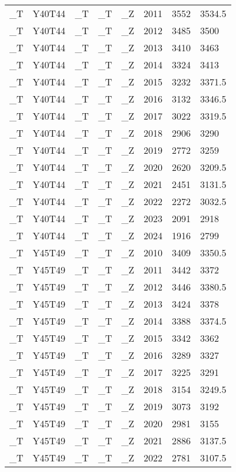 \begin{longtable}[t]{llllllll}
\_T & Y40T44 & \_T & \_T & \_Z & 2011 & 3552 & 3534.5\\
\_T & Y40T44 & \_T & \_T & \_Z & 2012 & 3485 & 3500\\
\_T & Y40T44 & \_T & \_T & \_Z & 2013 & 3410 & 3463\\
\_T & Y40T44 & \_T & \_T & \_Z & 2014 & 3324 & 3413\\
\addlinespace
\_T & Y40T44 & \_T & \_T & \_Z & 2015 & 3232 & 3371.5\\
\_T & Y40T44 & \_T & \_T & \_Z & 2016 & 3132 & 3346.5\\
\_T & Y40T44 & \_T & \_T & \_Z & 2017 & 3022 & 3319.5\\
\_T & Y40T44 & \_T & \_T & \_Z & 2018 & 2906 & 3290\\
\_T & Y40T44 & \_T & \_T & \_Z & 2019 & 2772 & 3259\\
\addlinespace
\_T & Y40T44 & \_T & \_T & \_Z & 2020 & 2620 & 3209.5\\
\_T & Y40T44 & \_T & \_T & \_Z & 2021 & 2451 & 3131.5\\
\_T & Y40T44 & \_T & \_T & \_Z & 2022 & 2272 & 3032.5\\
\_T & Y40T44 & \_T & \_T & \_Z & 2023 & 2091 & 2918\\
\_T & Y40T44 & \_T & \_T & \_Z & 2024 & 1916 & 2799\\
\addlinespace
\_T & Y45T49 & \_T & \_T & \_Z & 2010 & 3409 & 3350.5\\
\_T & Y45T49 & \_T & \_T & \_Z & 2011 & 3442 & 3372\\
\_T & Y45T49 & \_T & \_T & \_Z & 2012 & 3446 & 3380.5\\
\_T & Y45T49 & \_T & \_T & \_Z & 2013 & 3424 & 3378\\
\_T & Y45T49 & \_T & \_T & \_Z & 2014 & 3388 & 3374.5\\
\addlinespace
\_T & Y45T49 & \_T & \_T & \_Z & 2015 & 3342 & 3362\\
\_T & Y45T49 & \_T & \_T & \_Z & 2016 & 3289 & 3327\\
\_T & Y45T49 & \_T & \_T & \_Z & 2017 & 3225 & 3291\\
\_T & Y45T49 & \_T & \_T & \_Z & 2018 & 3154 & 3249.5\\
\_T & Y45T49 & \_T & \_T & \_Z & 2019 & 3073 & 3192\\
\addlinespace
\_T & Y45T49 & \_T & \_T & \_Z & 2020 & 2981 & 3155\\
\_T & Y45T49 & \_T & \_T & \_Z & 2021 & 2886 & 3137.5\\
\_T & Y45T49 & \_T & \_T & \_Z & 2022 & 2781 & 3107.5\\

\end{longtable}
